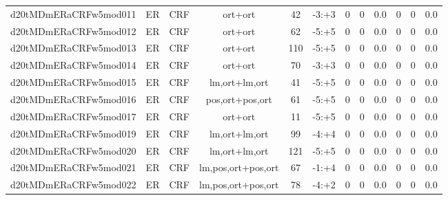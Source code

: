 \documentclass[a4paper]{article}
\begin{document}
\begin{landscape}
\begin{center}
\begin{tabular}{ |c|c|c|c|c|c|c|c|c|c|c|c|}
 
 	
 	\small{ d20tMDmERaCRFw5mod011 } & ER & CRF & ort+ort  &  42 &  -3:+3  &  0 & 0 & 0.0  &  0 & 0 & 0.0 \\
 	

 
 	
 	\small{ d20tMDmERaCRFw5mod012 } & ER & CRF & ort+ort  &  62 &  -5:+5  &  0 & 0 & 0.0  &  0 & 0 & 0.0 \\
 	

 
 	
 	\small{ d20tMDmERaCRFw5mod013 } & ER & CRF & ort+ort  &  110 &  -5:+5  &  0 & 0 & 0.0  &  0 & 0 & 0.0 \\
 	

 
 	
 	\small{ d20tMDmERaCRFw5mod014 } & ER & CRF & ort+ort  &  70 &  -3:+3  &  0 & 0 & 0.0  &  0 & 0 & 0.0 \\
 	

 
 	
 	\small{ d20tMDmERaCRFw5mod015 } & ER & CRF & lm,ort+lm,ort  &  41 &  -5:+5  &  0 & 0 & 0.0  &  0 & 0 & 0.0 \\
 	

 
 	
 	\small{ d20tMDmERaCRFw5mod016 } & ER & CRF & pos,ort+pos,ort  &  61 &  -5:+5  &  0 & 0 & 0.0  &  0 & 0 & 0.0 \\
 	

 
 	
 	\small{ d20tMDmERaCRFw5mod017 } & ER & CRF & ort+ort  &  11 &  -5:+5  &  0 & 0 & 0.0  &  0 & 0 & 0.0 \\
 	

 
 	
 	\small{ d20tMDmERaCRFw5mod019 } & ER & CRF & lm,ort+lm,ort  &  99 &  -4:+4  &  0 & 0 & 0.0  &  0 & 0 & 0.0 \\
 	

 
 	
 	\small{ d20tMDmERaCRFw5mod020 } & ER & CRF & lm,ort+lm,ort  &  121 &  -5:+5  &  0 & 0 & 0.0  &  0 & 0 & 0.0 \\
 	

 
 	
 	\small{ d20tMDmERaCRFw5mod021 } & ER & CRF & lm,pos,ort+pos,ort  &  67 &  -1:+4  &  0 & 0 & 0.0  &  0 & 0 & 0.0 \\
 	

 
 	
 	\small{ d20tMDmERaCRFw5mod022 } & ER & CRF & lm,pos,ort+pos,ort  &  78 &  -4:+2  &  0 & 0 & 0.0  &  0 & 0 & 0.0 \\
 	


\end{tabular}
\end{center}
\end{landscape}
\end{document}
